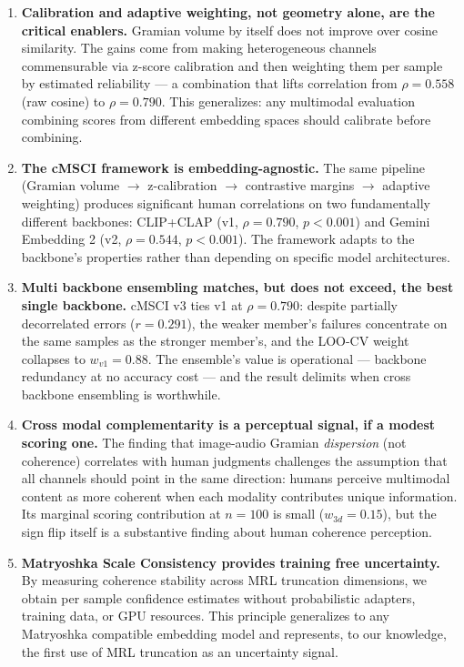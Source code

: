 \begin{enumerate}
\item \textbf{Calibration and adaptive weighting, not geometry alone, are the critical enablers.} Gramian volume by itself does not improve over cosine similarity. The gains come from making heterogeneous channels commensurable via z-score calibration and then weighting them per sample by estimated reliability — a combination that lifts correlation from $\rho = 0.558$ (raw cosine) to $\rho = 0.790$. This generalizes: any multimodal evaluation combining scores from different embedding spaces should calibrate before combining.

\item \textbf{The cMSCI framework is embedding-agnostic.} The same pipeline (Gramian volume $\rightarrow$ z-calibration $\rightarrow$ contrastive margins $\rightarrow$ adaptive weighting) produces significant human correlations on two fundamentally different backbones: CLIP+CLAP (v1, $\rho = 0.790$, $p < 0.001$) and Gemini Embedding 2 (v2, $\rho = 0.544$, $p < 0.001$). The framework adapts to the backbone's properties rather than depending on specific model architectures.

\item \textbf{Multi backbone ensembling matches, but does not exceed, the best single backbone.} cMSCI v3 ties v1 at $\rho = 0.790$: despite partially decorrelated errors ($r = 0.291$), the weaker member's failures concentrate on the same samples as the stronger member's, and the LOO-CV weight collapses to $w_{v1} = 0.88$. The ensemble's value is operational — backbone redundancy at no accuracy cost — and the result delimits when cross backbone ensembling is worthwhile.

\item \textbf{Cross modal complementarity is a perceptual signal, if a modest scoring one.} The finding that image-audio Gramian \emph{dispersion} (not coherence) correlates with human judgments challenges the assumption that all channels should point in the same direction: humans perceive multimodal content as more coherent when each modality contributes unique information. Its marginal scoring contribution at $n = 100$ is small ($w_{3d} = 0.15$), but the sign flip itself is a substantive finding about human coherence perception.

\item \textbf{Matryoshka Scale Consistency provides training free uncertainty.} By measuring coherence stability across MRL truncation dimensions, we obtain per sample confidence estimates without probabilistic adapters, training data, or GPU resources. This principle generalizes to any Matryoshka compatible embedding model and represents, to our knowledge, the first use of MRL truncation as an uncertainty signal.


\end{enumerate}
